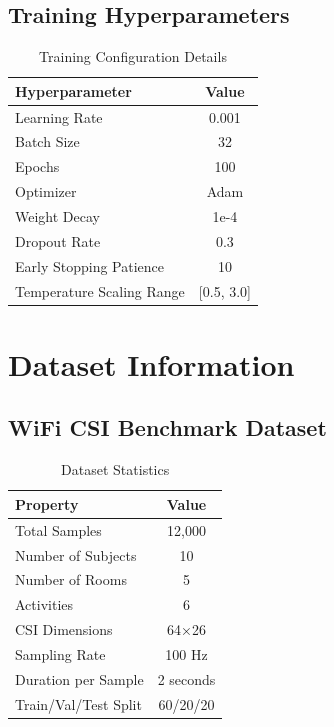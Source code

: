 \documentclass[10pt,journal,compsoc]{IEEEtran}
\begin{document}
\subsection{Training Hyperparameters}

\begin{table}[h!]
\centering
\caption{Training Configuration Details}
\label{tab:s7_hyperparameters}
\begin{tabular}{@{}lc@{}}
\toprule
\textbf{Hyperparameter} & \textbf{Value} \\
\midrule
Learning Rate & 0.001 \\
Batch Size & 32 \\
Epochs & 100 \\
Optimizer & Adam \\
Weight Decay & 1e-4 \\
Dropout Rate & 0.3 \\
Early Stopping Patience & 10 \\
Temperature Scaling Range & [0.5, 3.0] \\
\bottomrule
\end{tabular}
\end{table}

\section{Dataset Information}

\subsection{WiFi CSI Benchmark Dataset}

\begin{table}[h!]
\centering
\caption{Dataset Statistics}
\label{tab:s8_dataset}
\begin{tabular}{@{}lc@{}}
\toprule
\textbf{Property} & \textbf{Value} \\
\midrule
Total Samples & 12,000 \\
Number of Subjects & 10 \\
Number of Rooms & 5 \\
Activities & 6 \\
CSI Dimensions & 64×26 \\
Sampling Rate & 100 Hz \\
Duration per Sample & 2 seconds \\
Train/Val/Test Split & 60/20/20 \\
\bottomrule
\end{tabular}
\end{table}
\end{document}
